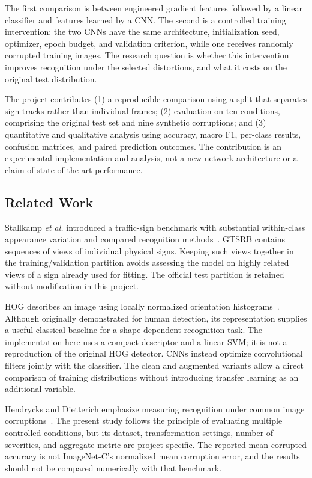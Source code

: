 \documentclass[conference]{IEEEtran}
\begin{document}
The first comparison is between engineered gradient features followed by a linear classifier and features learned by a CNN. The second is a controlled training intervention: the two CNNs have the same architecture, initialization seed, optimizer, epoch budget, and validation criterion, while one receives randomly corrupted training images. The research question is whether this intervention improves recognition under the selected distortions, and what it costs on the original test distribution.

The project contributes (1) a reproducible comparison using a split that separates sign tracks rather than individual frames; (2) evaluation on ten conditions, comprising the original test set and nine synthetic corruptions; and (3) quantitative and qualitative analysis using accuracy, macro F1, per-class results, confusion matrices, and paired prediction outcomes. The contribution is an experimental implementation and analysis, not a new network architecture or a claim of state-of-the-art performance.

\subsection{Related Work}
Stallkamp \emph{et al.} introduced a traffic-sign benchmark with substantial within-class appearance variation and compared recognition methods~\cite{gtsrb}. GTSRB contains sequences of views of individual physical signs. Keeping such views together in the training/validation partition avoids assessing the model on highly related views of a sign already used for fitting. The official test partition is retained without modification in this project.

HOG describes an image using locally normalized orientation histograms~\cite{hog}. Although originally demonstrated for human detection, its representation supplies a useful classical baseline for a shape-dependent recognition task. The implementation here uses a compact descriptor and a linear SVM; it is not a reproduction of the original HOG detector. CNNs instead optimize convolutional filters jointly with the classifier. The clean and augmented variants allow a direct comparison of training distributions without introducing transfer learning as an additional variable.

Hendrycks and Dietterich emphasize measuring recognition under common image corruptions~\cite{corruption}. The present study follows the principle of evaluating multiple controlled conditions, but its dataset, transformation settings, number of severities, and aggregate metric are project-specific. The reported mean corrupted accuracy is not ImageNet-C's normalized mean corruption error, and the results should not be compared numerically with that benchmark.
\end{document}
